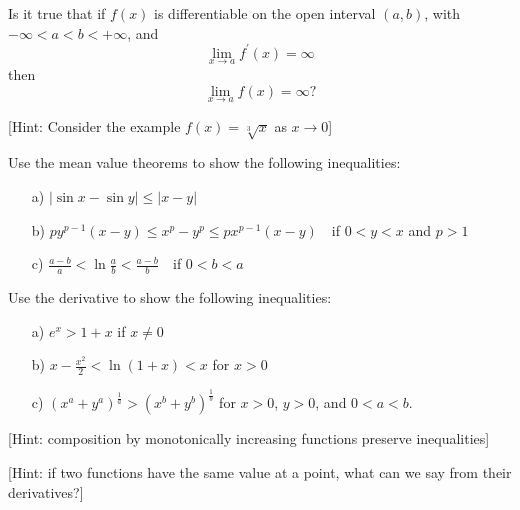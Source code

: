 \documentclass[11pt]{article}%
\begin{document}
\begin{Exercise}[title=*]
	Is it true that if $f(x)$ is differentiable on the open interval $(a,b)$, with $-\infty<a<b<+\infty$, and $$\lim_{x\to a}f^{\prime}(x)=\infty$$ then $$\lim_{x\to a}f(x)=\infty?$$ 
	
	[Hint: Consider the example $f(x)=\sqrt[3]{x}$ as $x\to 0$]
\end{Exercise}

\begin{Exercise}[title=**]
	Use the mean value theorems to show the following inequalities:
	\begin{itemize}
		\item[a)]{$|\sin x-\sin y|\leq |x-y|$}
		\item[b)]{$py^{p-1}(x-y)\leq x^p-y^p\leq px^{p-1}(x-y)$\ \  if $0<y<x$ and $p>1$}
		\item[c)]{$\frac{a-b}{a}<\ln\frac{a}{b}<\frac{a-b}{b}$\ \  if $0<b<a$}
	\end{itemize} 
\end{Exercise}

\newpage

\begin{Exercise}[title=**]
	Use the derivative to show the following inequalities:
	\begin{itemize}
		\item[a)]{$e^x>1+x$ if $x\neq 0$}
		\item[b)]{$x-\frac{x^2}{2}<\ln(1+x)<x$ for $x>0$}
		\item[c)]{$(x^a+y^a)^{\frac{1}{a}}>(x^b+y^b)^{\frac{1}{b}}$ for $x>0$, $y>0$, and $0<a<b$.}
	\end{itemize} 
	
	[Hint: composition by monotonically increasing functions preserve inequalities]
	
	[Hint: if two functions have the same value at a point, what can we say from their derivatives?]
\end{Exercise}
\end{document}
